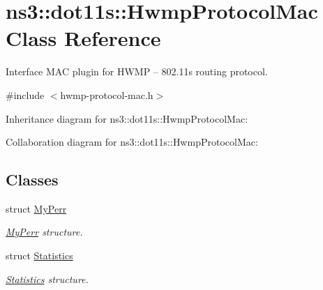 \hypertarget{classns3_1_1dot11s_1_1HwmpProtocolMac}{}\section{ns3\+:\+:dot11s\+:\+:Hwmp\+Protocol\+Mac Class Reference}
\label{classns3_1_1dot11s_1_1HwmpProtocolMac}


Interface M\+AC plugin for H\+W\+MP -- 802.\+11s routing protocol.  




{\ttfamily \#include $<$hwmp-\/protocol-\/mac.\+h$>$}



Inheritance diagram for ns3\+:\+:dot11s\+:\+:Hwmp\+Protocol\+Mac\+:


Collaboration diagram for ns3\+:\+:dot11s\+:\+:Hwmp\+Protocol\+Mac\+:
\subsection*{Classes}
\begin{DoxyCompactItemize}
\item 
struct \hyperlink{structns3_1_1dot11s_1_1HwmpProtocolMac_1_1MyPerr}{My\+Perr}
\begin{DoxyCompactList}\small\item\em \hyperlink{structns3_1_1dot11s_1_1HwmpProtocolMac_1_1MyPerr}{My\+Perr} structure. \end{DoxyCompactList}\item 
struct \hyperlink{structns3_1_1dot11s_1_1HwmpProtocolMac_1_1Statistics}{Statistics}
\begin{DoxyCompactList}\small\item\em \hyperlink{structns3_1_1dot11s_1_1HwmpProtocolMac_1_1Statistics}{Statistics} structure. \end{DoxyCompactList}\end{DoxyCompactItemize}
